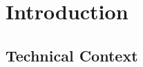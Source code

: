 \documentclass[12pt,twoside]{report}
\begin{document}


\clearpage{\pagestyle{empty}\cleardoublepage}
\setcounter{page}{1}
\pagestyle{fancy}




\begin{abstract}\label{sect:abstract}
   

\end{abstract}
  
\tableofcontents
  


\setcounter{page}{1}
\fancyhead[LE,RO]{\slshape \rightmark}
\fancyhead[LO,RE]{\slshape \leftmark}

\chapter{Introduction}



\section{Technical Context}

\end{document}
